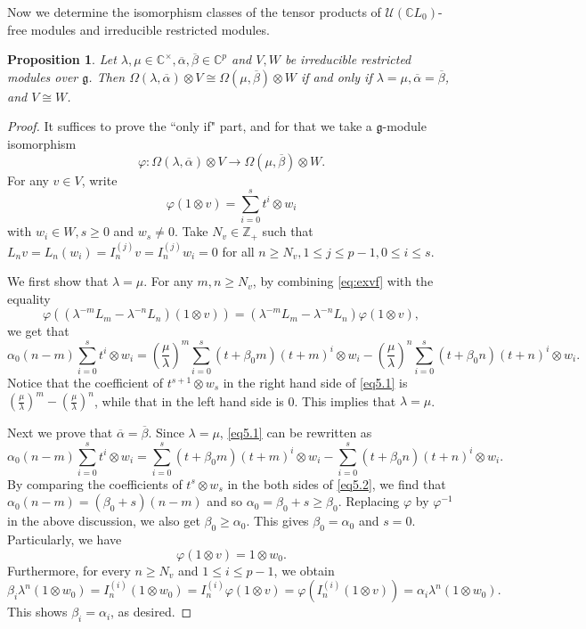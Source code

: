 \documentclass[12pt, reqno]{amsart}
\numberwithin{equation}{section}
\newtheorem{proposition}[theorem]{Proposition}%
\numberwithin{equation}{section}
\def\lmd{\lambda}
\def\al{\alpha}
\def\be{\beta}
\def\g{\mathfrak{g}}
\def\vf{\varphi}
\def\U{\mathcal{U}}
\newcommand{\C}{\mathbb C}
\newcommand{\Z}{\mathbb{Z}}
\newcommand{\ov}[1]{\overline{#1}}
\newcommand{\elei}[2]{I_{#1}^{(#2)}}
\begin{document}
Now we determine the isomorphism classes of the tensor products of $\U(\C L_0)$-free modules and irreducible restricted modules.
\begin{proposition}\label{prop5.2}
 Let $\lmd,\mu\in\C^\times, \ov\al,\ov\beta\in\C^p$ and $V,W$ be irreducible restricted modules over $\g$.
 Then  $\Omega(\lmd,\ov\al)\otimes V\cong\Omega(\mu,\ov\beta)\otimes W$
 if and only if $\lmd=\mu, \ov\al=\ov\beta$, and $V\cong W$.
\end{proposition}
\begin{proof}
 It suffices to prove the ``only if" part, and for that we take a $\g$-module isomorphism
 \[\vf:\Omega(\lmd,\ov\al)\otimes V\longrightarrow\Omega(\mu,\ov\beta)\otimes W.\]
 For any $v\in V$, write
 \begin{equation}\label{eq:exvf}
    \vf(1\otimes v)=\sum_{i=0}^st^i\otimes w_i
 \end{equation} with $w_i\in W,s\geq 0$ and $w_s\neq 0$.
 Take $N_v\in\Z_+$ such that $L_nv=L_n(w_i)=\elei njv=\elei njw_i=0$ for all $n\geq N_v,1\leq j\leq p-1,0\leq i\leq s$.

 We first show that $\lambda=\mu$.
 For any $m,n\geq N_v$, by combining \eqref{eq:exvf} with the equality
 \[\vf\left(\left(\lmd^{-m}L_m-\lmd^{-n}L_n\right)(1\otimes v)\right)
     =\left(\lmd^{-m}L_m-\lmd^{-n}L_n\right)\vf(1\otimes v),\]
     we get that
 \begin{equation}\label{eq5.1}
   \al_0(n-m)\sum_{i=0}^st^i\otimes w_i
   =\left(\frac\mu\lmd\right)^m\sum_{i=0}^s(t+\be_0m)(t+m)^i\otimes w_i
     -\left(\frac\mu\lmd\right)^n\sum_{i=0}^s(t+\be_0n)(t+n)^i\otimes w_i.
 \end{equation}
 Notice that the coefficient of $t^{s+1}\otimes w_s$ in the right hand side of \eqref{eq5.1} is
 $\left(\frac\mu\lmd\right)^m-\left(\frac\mu\lmd\right)^n$, while that in the left hand side is 0.
This implies that  $\lmd=\mu$.

Next we prove that $\ov\alpha=\ov\beta$.
Since  $\lmd=\mu$, \eqref{eq5.1} can be rewritten as
 \begin{equation}\label{eq5.2}
   \al_0(n-m)\sum_{i=0}^st^i\otimes w_i=\sum_{i=0}^s(t+\be_0m)(t+m)^i\otimes w_i
          -\sum_{i=0}^s(t+\be_0n)(t+n)^i\otimes w_i.
 \end{equation}
By comparing  the coefficients of $t^s\otimes w_s$ in the both sides of \eqref{eq5.2}, we find that
 $\al_0(n-m)=(\be_0+s)(n-m)$ and so $\al_0=\be_0+s\geq \be_0$.
 Replacing $\vf$ by $\vf^{-1}$ in the above discussion, we also get $\be_0\geq \al_0$.
 This gives  $\be_0=\al_0$ and $s=0$. Particularly, we have  \[\vf(1\otimes v)=1\otimes w_0.\]
Furthermore, for every $n\geq N_v $ and $1\leq i\leq p-1$, we obtain
 $$\be_i\lmd^n(1\otimes w_0)=\elei ni(1\otimes w_0)=\elei ni\vf(1\otimes v)
      =\vf\left(\elei ni(1\otimes v)\right)=\al_i\lmd^n(1\otimes w_0).$$
This shows $\be_i=\al_i$, as desired.


\end{proof}
\end{document}
